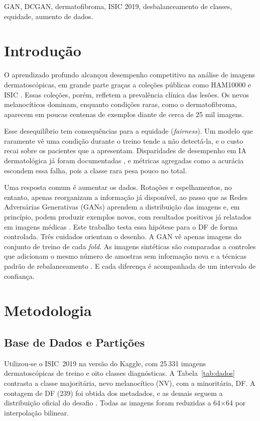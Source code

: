 \documentclass[conference]{IEEEtran}
\begin{document}
\begin{IEEEkeywords}
GAN, DCGAN, dermatofibroma, ISIC 2019, desbalanceamento de classes, equidade, aumento de dados.
\end{IEEEkeywords}

\section{Introdução}
O aprendizado profundo alcançou desempenho competitivo na análise de imagens dermatoscópicas, em grande parte graças a coleções públicas como HAM10000 e ISIC \cite{tschandl2018ham10000,codella2018skin,combalia2019bcn20000}. Essas coleções, porém, refletem a prevalência clínica das lesões. Os nevos melanocíticos dominam, enquanto condições raras, como o dermatofibroma, aparecem em poucas centenas de exemplos diante de cerca de 25 mil imagens.

Esse desequilíbrio tem consequências para a equidade (\textit{fairness}). Um modelo que raramente vê uma condição durante o treino tende a não detectá-la, e o custo recai sobre os pacientes que a apresentam. Disparidades de desempenho em IA dermatológica já foram documentadas \cite{daneshjou2022disparities}, e métricas agregadas como a acurácia escondem essa falha, pois a classe rara pesa pouco no total.

Uma resposta comum é aumentar os dados. Rotações e espelhamentos, no entanto, apenas reorganizam a informação já disponível, ao passo que as Redes Adversárias Generativas (GANs) \cite{goodfellow2014generative} aprendem a distribuição das imagens e, em princípio, podem produzir exemplos novos, com resultados positivos já relatados em imagens médicas \cite{frid2018gan}. Este trabalho testa essa hipótese para o DF de forma controlada. Três cuidados orientam o desenho. A GAN vê apenas imagens do conjunto de treino de cada \textit{fold}. As imagens sintéticas são comparadas a controles que adicionam o mesmo número de amostras sem informação nova e a técnicas padrão de rebalanceamento \cite{buda2018systematic}. E cada diferença é acompanhada de um intervalo de confiança.

\section{Metodologia}

\subsection{Base de Dados e Partições}
Utilizou-se o ISIC~2019 na versão do Kaggle, com 25\,331 imagens dermatoscópicas de treino e oito classes diagnósticas. A Tabela~\ref{tab:dados} contrasta a classe majoritária, nevo melanocítico (NV), com a minoritária, DF. A contagem de DF (239) foi obtida dos metadados, e as demais seguem a distribuição oficial do desafio \cite{combalia2019bcn20000}. Todas as imagens foram reduzidas a 64$\times$64 por interpolação bilinear.
\end{document}
